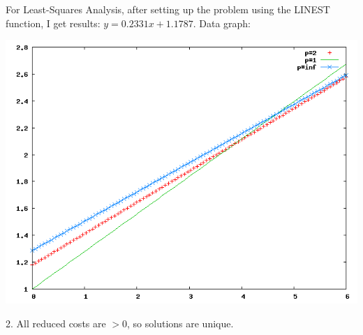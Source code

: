 \documentclass{article}
\begin{document}
For Least-Squares Analysis, after setting up the problem using the LINEST function, I get results: $y = 0.2331 x + 1.1787$. Data graph:

\includegraphics[width=\linewidth]{out1.png}

2. All reduced costs are $> 0$, so solutions are unique.
\end{document}
